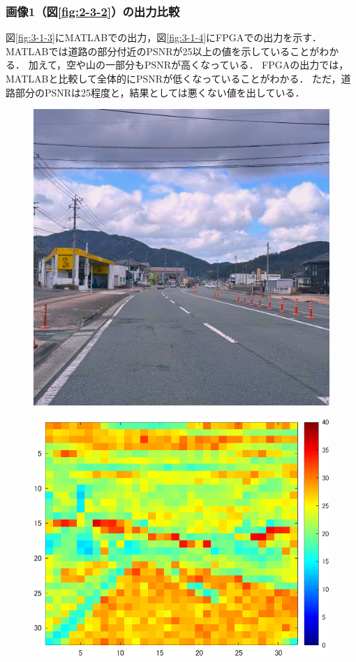 \documentclass[paper]{ieicej}
\begin{document}
\subsubsection{画像1（図\ref{fig:2-3-2}）の出力比較}
図\ref{fig:3-1-3}にMATLABでの出力，図\ref{fig:3-1-4}にFPGAでの出力を示す．
MATLABでは道路の部分付近のPSNRが25以上の値を示していることがわかる．
加えて，空や山の一部分もPSNRが高くなっている．
FPGAの出力では，MATLABと比較して全体的にPSNRが低くなっていることがわかる．
ただ，道路部分のPSNRは25程度と，結果としては悪くない値を出している．
\begin{figure}[tb]
  \begin{minipage}[]{0.32\columnwidth}
    \centering
    \includegraphics[width=0.9\columnwidth]{figures/Ex_pr1.png}
    \label{fig:3-1-2}
  \end{minipage}
  \begin{minipage}[]{0.32\linewidth}
    \centering
    \includegraphics[width=0.9\columnwidth]{figures/Ex_re1.png}

\end{minipage}
\end{figure}
\end{document}
